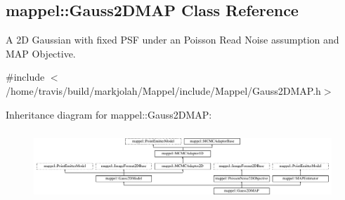 \hypertarget{classmappel_1_1Gauss2DMAP}{}\subsection{mappel\+:\+:Gauss2\+D\+M\+AP Class Reference}
\label{classmappel_1_1Gauss2DMAP}


A 2D Gaussian with fixed P\+SF under an Poisson Read Noise assumption and M\+AP Objective.  




{\ttfamily \#include $<$/home/travis/build/markjolah/\+Mappel/include/\+Mappel/\+Gauss2\+D\+M\+A\+P.\+h$>$}

Inheritance diagram for mappel\+:\+:Gauss2\+D\+M\+AP\+:\begin{figure}[H]
\begin{center}
\leavevmode
\includegraphics[height=2.641510cm]{classmappel_1_1Gauss2DMAP}
\end{center}
\end{figure}
